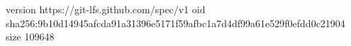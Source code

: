 version https://git-lfs.github.com/spec/v1
oid sha256:9b10d14945afcda91a31396e5171f59afbc1a7d4df99a61e529f0efdd0c21904
size 109648
